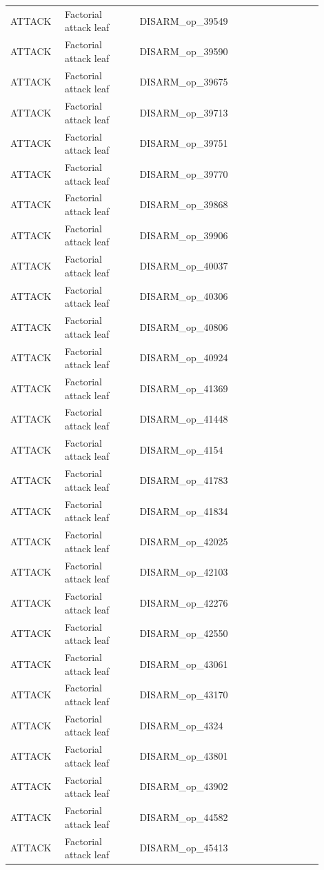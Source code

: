 \begin{table}[htbp]
\begin{threeparttable}
\begin{tabular}{p{0.14\linewidth}p{0.22\linewidth}p{0.54\linewidth}}
ATTACK & Factorial attack leaf & DISARM\_op\_39549 \\
ATTACK & Factorial attack leaf & DISARM\_op\_39590 \\
ATTACK & Factorial attack leaf & DISARM\_op\_39675 \\
ATTACK & Factorial attack leaf & DISARM\_op\_39713 \\
ATTACK & Factorial attack leaf & DISARM\_op\_39751 \\
ATTACK & Factorial attack leaf & DISARM\_op\_39770 \\
ATTACK & Factorial attack leaf & DISARM\_op\_39868 \\
ATTACK & Factorial attack leaf & DISARM\_op\_39906 \\
ATTACK & Factorial attack leaf & DISARM\_op\_40037 \\
ATTACK & Factorial attack leaf & DISARM\_op\_40306 \\
ATTACK & Factorial attack leaf & DISARM\_op\_40806 \\
ATTACK & Factorial attack leaf & DISARM\_op\_40924 \\
ATTACK & Factorial attack leaf & DISARM\_op\_41369 \\
ATTACK & Factorial attack leaf & DISARM\_op\_41448 \\
ATTACK & Factorial attack leaf & DISARM\_op\_4154 \\
ATTACK & Factorial attack leaf & DISARM\_op\_41783 \\
ATTACK & Factorial attack leaf & DISARM\_op\_41834 \\
ATTACK & Factorial attack leaf & DISARM\_op\_42025 \\
ATTACK & Factorial attack leaf & DISARM\_op\_42103 \\
ATTACK & Factorial attack leaf & DISARM\_op\_42276 \\
ATTACK & Factorial attack leaf & DISARM\_op\_42550 \\
ATTACK & Factorial attack leaf & DISARM\_op\_43061 \\
ATTACK & Factorial attack leaf & DISARM\_op\_43170 \\
ATTACK & Factorial attack leaf & DISARM\_op\_4324 \\
ATTACK & Factorial attack leaf & DISARM\_op\_43801 \\
ATTACK & Factorial attack leaf & DISARM\_op\_43902 \\
ATTACK & Factorial attack leaf & DISARM\_op\_44582 \\
ATTACK & Factorial attack leaf & DISARM\_op\_45413 \\

\end{tabular}
\end{threeparttable}
\end{table}
